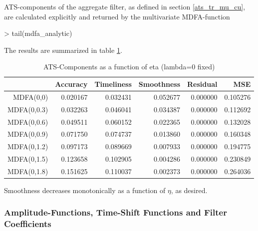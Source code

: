 \documentclass[a4paper]{book}
\begin{document}
ATS-components of the aggregate filter, as defined in section \ref{ats_tr_mu_cu}, are calculated explicitly and returned by the multivariate MDFA-function
\begin{Schunk}
\begin{Sinput}
> tail(mdfa_analytic)
\end{Sinput}
\begin{Soutput}
186     else {                                                                      
187         return(list(b = b, trffkt = trffkt, rever = rever, Accuracy = Accuracy, 
188             Smoothness = Smoothness, Timeliness = Timeliness,                   
189             MS_error = MS_error))                                               
190     }                                                                           
191 }                                                                               
\end{Soutput}
\end{Schunk}
The results are summarized in table \ref{ats_comp_mdfa_S}.
\begin{table}[ht]
\centering
\begin{tabular}{rrrrrr}
  \hline
 & Accuracy & Timeliness & Smoothness & Residual & MSE \\ 
  \hline
MDFA(0,0) & 0.020167 & 0.032431 & 0.052677 & 0.000000 & 0.105276 \\ 
  MDFA(0,0.3) & 0.032263 & 0.046041 & 0.034387 & 0.000000 & 0.112692 \\ 
  MDFA(0,0.6) & 0.049511 & 0.060152 & 0.022365 & 0.000000 & 0.132028 \\ 
  MDFA(0,0.9) & 0.071750 & 0.074737 & 0.013860 & 0.000000 & 0.160348 \\ 
  MDFA(0,1.2) & 0.097173 & 0.089669 & 0.007933 & 0.000000 & 0.194775 \\ 
  MDFA(0,1.5) & 0.123658 & 0.102905 & 0.004286 & 0.000000 & 0.230849 \\ 
  MDFA(0,1.8) & 0.151625 & 0.110037 & 0.002373 & 0.000000 & 0.264036 \\ 
   \hline
\end{tabular}
\caption{ATS-Components as a function of eta (lambda=0 fixed)} 
\label{ats_comp_mdfa_S}
\end{table}Smoothness decreases  monotonically as a function of $\eta$, as desired.



\subsubsection{Amplitude-Functions, Time-Shift Functions and Filter Coefficients}
\end{document}
